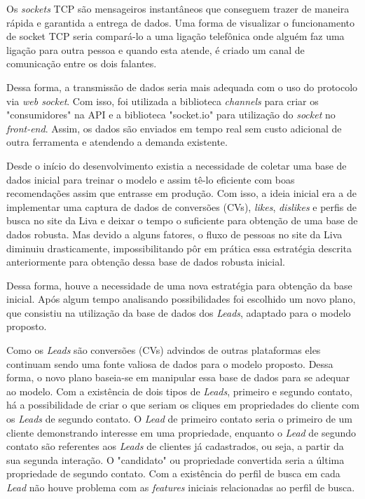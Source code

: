 Os \textit{sockets} TCP são mensageiros instantâneos que conseguem trazer de maneira rápida e garantida a entrega de dados. Uma forma de visualizar o funcionamento de socket TCP seria compará-lo a uma ligação telefônica onde alguém faz uma ligação para outra pessoa e quando esta atende, é criado um canal de comunicação entre os dois falantes. \cite{Carla:2005}

Dessa forma, a transmissão de dados seria mais adequada com o uso do protocolo via \textit{web socket}. Com isso, foi utilizada a biblioteca \textit{channels} para criar os "consumidores" na API e a biblioteca "socket.io" para utilização do \textit{socket} no \textit{front-end}. Assim, os dados são enviados em tempo real sem custo adicional de outra ferramenta e atendendo a demanda existente.

Desde o início do desenvolvimento existia a necessidade de coletar uma base de dados inicial para treinar o modelo e assim tê-lo eficiente com boas recomendações assim que entrasse em produção. Com isso, a ideia inicial era a de implementar uma captura de dados de conversões (CVs), \textit{likes}, \textit{dislikes} e perfis de busca no site da Liva e deixar o tempo o suficiente para obtenção de uma base de dados robusta. Mas devido a alguns fatores, o fluxo de pessoas no site da Liva diminuiu drasticamente, impossibilitando pôr em prática essa estratégia descrita anteriormente para obtenção dessa base de dados robusta inicial.

Dessa forma, houve a necessidade de uma nova estratégia para obtenção da base inicial. Após algum tempo analisando possibilidades foi escolhido um novo plano, que consistiu na utilização da base de dados dos \textit{Leads}, adaptado para o modelo proposto.

Como os \textit{Leads} são conversões (CVs) advindos de outras plataformas eles continuam sendo uma fonte valiosa de dados para o modelo proposto. Dessa forma, o novo plano baseia-se em manipular essa base de dados para se adequar ao modelo. Com a existência de dois tipos de \textit{Leads}, primeiro e segundo contato, há a possibilidade de criar o que seriam os cliques em propriedades do cliente com os \textit{Leads} de segundo contato. O \textit{Lead} de primeiro contato seria o primeiro de um cliente demonstrando interesse em uma propriedade, enquanto o \textit{Lead} de segundo contato são referentes aos \textit{Leads} de clientes já cadastrados, ou seja, a partir da sua segunda interação. O "candidato" ou propriedade convertida seria a última propriedade de segundo contato. Com a  existência do perfil de busca em cada \textit{Lead} não houve problema com as \textit{features} iniciais relacionadas ao perfil de busca.

